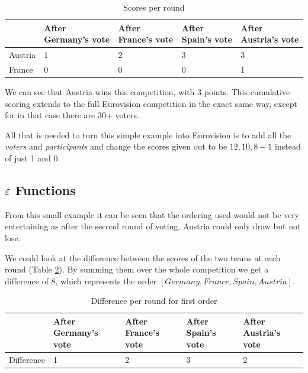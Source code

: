 \documentclass[12pt]{report}
\begin{document}
\begin{table}[H]
\centering
\caption{Scores per round}
\label{t_simpleScores}
\begin{tabular}{|l|l|l|l|l|}
\hline
        & After Germany's vote & After France's vote & After Spain's vote & After Austria's vote \\ \hline
Austria & 1                    & 2                  & 3                   & 3                    \\ \hline
France  & 0                    & 0                  & 0                   & 1                    \\ \hline
\end{tabular}
\end{table}

We can see that Austria wins this competition, with 3 points. This cumulative scoring extends to the full Eurovision competition in the exact same way, except for in that case there are 30+ voters.

All that is needed to turn this simple example into Eurovision is to add all the \textit{voters} and \textit{participants} and change the scores given out to be $12, 10, 8-1$ instead of just 1 and 0.

\subsection{$\varepsilon$ Functions}\label{EntertainmentFunction}
From this small example it can be seen that the ordering used would not be very entertaining as after the second round of voting, Austria could only draw but not lose. 

We could look at the difference between the scores of the two teams at each round (Table \ref{t_simpleDifferences}). By summing them over the whole competition we get a difference of 8, which represents the order $[Germany, France, Spain, Austria]$. 

\begin{table}[H]
\centering
\caption{Difference per round for first order}
\label{t_simpleDifferences}
\begin{tabular}{|l|l|l|l|l|}
\hline
        & After Germany's vote & After France's vote & After Spain's vote & After Austria's vote \\ \hline
Difference & 1                    & 2                  & 3                   & 2                    \\ \hline
\end{tabular}
\end{table}
\end{document}
